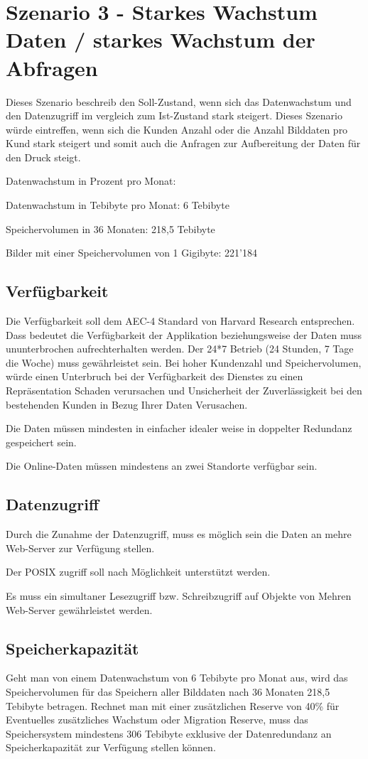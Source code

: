 \section{Szenario 3 - Starkes Wachstum Daten / starkes Wachstum der Abfragen}
Dieses Szenario beschreib den Soll-Zustand, wenn sich das Datenwachstum und den Datenzugriff im vergleich zum Ist-Zustand stark steigert. Dieses Szenario würde eintreffen, wenn sich die Kunden Anzahl oder die Anzahl Bilddaten pro Kund stark steigert und somit auch die Anfragen zur Aufbereitung der Daten für den Druck steigt.

Datenwachstum in Prozent pro Monat: 

Datenwachstum in Tebibyte pro Monat: 6 Tebibyte

Speichervolumen in 36 Monaten: 218,5 Tebibyte

Bilder mit einer Speichervolumen von 1 Gigibyte: 221'184

\subsection{Verfügbarkeit}
Die Verfügbarkeit soll dem AEC-4 Standard von Harvard Research entsprechen. Dass bedeutet die Verfügbarkeit der Applikation beziehungsweise der Daten muss ununterbrochen aufrechterhalten werden.  Der 24*7 Betrieb (24 Stunden, 7 Tage die Woche) muss gewährleistet sein. Bei hoher Kundenzahl und Speichervolumen, würde einen Unterbruch bei der Verfügbarkeit des Dienstes zu einen Repräsentation Schaden verursachen und Unsicherheit der Zuverlässigkeit bei den bestehenden Kunden in Bezug Ihrer Daten Verusachen.

Die Daten müssen mindesten in einfacher idealer weise in doppelter Redundanz gespeichert sein. 

Die Online-Daten müssen mindestens an zwei Standorte verfügbar sein.

\subsection{Datenzugriff}
Durch die Zunahme der Datenzugriff, muss es möglich sein die Daten an mehre Web-Server zur Verfügung stellen.

Der \gls{POSIX} zugriff soll nach Möglichkeit unterstützt werden.

Es muss ein simultaner Lesezugriff bzw. Schreibzugriff auf Objekte von Mehren Web-Server gewährleistet werden.

\subsection{Speicherkapazität}
Geht man von einem Datenwachstum von 6 Tebibyte pro Monat aus, wird das Speichervolumen für das Speichern aller Bilddaten nach 36 Monaten 218,5 Tebibyte betragen. Rechnet man mit einer zusätzlichen Reserve von 40\% für Eventuelles zusätzliches Wachstum oder Migration Reserve, muss das Speichersystem mindestens 306 Tebibyte exklusive der Datenredundanz an Speicherkapazität zur Verfügung stellen können.


